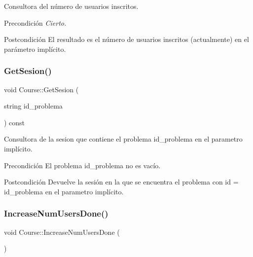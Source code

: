 Consultora del número de usuarios inscritos. 

\begin{DoxyPrecond}{Precondición}
{\itshape Cierto.} 
\end{DoxyPrecond}
\begin{DoxyPostcond}{Postcondición}
El resultado es el número de usuarios inscritos (actualmente) en el parámetro implícito. 
\end{DoxyPostcond}
\mbox{\label{class_course_a56a7f6bfd9dcd415c35246b2dc4afddb}} 
\subsubsection{\texorpdfstring{Get\+Sesion()}{GetSesion()}}
{\footnotesize\ttfamily void Course\+::\+Get\+Sesion (\begin{DoxyParamCaption}\item[{string}]{id\+\_\+problema }\end{DoxyParamCaption}) const}



Consultora de la sesion que contiene el problema id\+\_\+problema en el parametro implícito. 

\begin{DoxyPrecond}{Precondición}
El problema id\+\_\+problema no es vacío. 
\end{DoxyPrecond}
\begin{DoxyPostcond}{Postcondición}
Devuelve la sesión en la que se encuentra el problema con id = id\+\_\+problema en el parametro implícito. 
\end{DoxyPostcond}
\mbox{\label{class_course_aa44f6ece5bc630400d9e7edff41680c0}} 
\subsubsection{\texorpdfstring{Increase\+Num\+Users\+Done()}{IncreaseNumUsersDone()}}
{\footnotesize\ttfamily void Course\+::\+Increase\+Num\+Users\+Done (\begin{DoxyParamCaption}{ }\end{DoxyParamCaption})}



